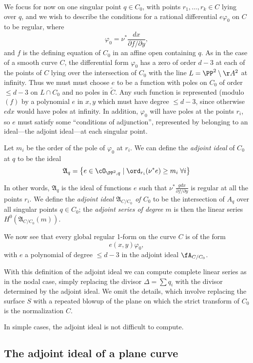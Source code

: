 We focus for now on one singular point $q \in C_0$, with points $r_1,\dots,r_k \in C$ lying over $q$, and we wish to describe the conditions for a rational differential $e\varphi_0$ on $C$ to be regular, where
$$
\varphi_0 = \nu^* \frac{dx}{\partial f/\partial y},
$$
and $f$ is the defining equation of $C_0$ in an affine open containing $q$. As in the case of a smooth curve $C$, the differential
form $\varphi_0$ has a zero of order $d-3$ at each of the points of $C$ lying over the intersection of $C_0$ with the line  $L = \PP^2\setminus \AA^2$
at infinity. Thus we must must choose $e$ to be a function with poles on $C_0$ of order $\leq d-3$ on $L\cap C_0$ and no poles in $\widetilde C$. Any such function is represented (modulo $(f)$ by 
a polynomial $e$ in $x,y$ which must have degree $\leq d-3$, since otherwise $edx$ would have poles at infinity. In addition, $\varphi_0$ will have poles at the points $r_i$,
so $e$ must satisfy some ``conditions of adjunction'', represented by belonging to an ideal---the adjoint ideal---at each singular point.

Let $m_i$ be the order of the pole of $\varphi_0$ at $r_i$. We can define the \emph{adjoint ideal} of $C_0$ at $q$ to be the ideal
$$
\mathfrak A_{q} = \left\{ e \in \cO_{\PP^2, q} \mid \ord_{r_i}(\nu^*e) \geq m_i \; \forall i \right\}
$$

In other words, $\mathfrak A_q$ is the ideal of functions $e$ such that $\nu^* \frac{gdx}{\partial f/\partial y}$ is regular at all the points $r_i$. We define the \emph{adjoint ideal $\mathfrak A_{C/C_0}$ of $C_0$} to be the intersection of $A_q$ over all singular points  $q \in C_0$; the \emph{adjoint series of degree $m$} is then the linear series $H^0(\mathfrak A_{C/C_0}(m))$. 

We now see  that every global regular 1-form on the curve $C$ is of the form 
$$
e(x,y) \varphi_0,
$$
with $e$ a polynomial of degree $\leq d-3$ in the adjoint ideal $\fA_{C/C_0}$.

With this definition of the adjoint ideal we can compute complete linear series as in the nodal case, simply replacing
the divisor $\Delta = \sum q_i$ with the divisor determined by the adjoint ideal. We omit the details, which involve replacing
the surface $S$ with a repeated blowup of the plane on which the strict transform of $C_0$ is the normalization $C$.

In simple cases, the adjoint ideal is not difficult to compute. 

\subsection{The adjoint ideal of a plane curve}

